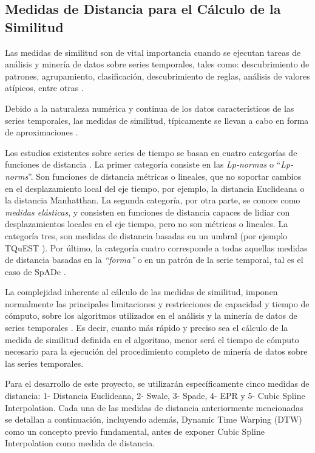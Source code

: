 \subsection{Medidas de Distancia para el C\'alculo de la Similitud}
Las medidas de similitud son de vital importancia cuando se ejecutan tareas de an\'alisis y miner\'ia de datos sobre series temporales, tales como: descubrimiento de patrones, agrupamiento, clasificaci\'on, descubrimiento de reglas, an\'alisis de valores at\'ipicos, entre otras \cite{concepts}.\par
Debido a la naturaleza num\'erica y continua de los datos caracter\'isticos de las series temporales, las medidas de similitud, t\'ipicamente se llevan a cabo en forma de aproximaciones \cite{distancecomparison}.\par
Los estudios existentes sobre series de tiempo se basan en cuatro categor\'ias de funciones de distancia \cite{measurements}. La primer categor\'ia consiste en las \textit{Lp-normas} o \enquote{\textit{Lp-norms}}. Son funciones de distancia m\'etricas o lineales, que no soportar cambios en el desplazamiento local del eje tiempo, por ejemplo, la distancia Euclideana o la distancia Manhatthan. La segunda categor\'ia, por otra parte, se conoce como \textit{medidas el\'asticas}, y consisten en funciones de distancia capaces de lidiar con desplazamientos locales en el eje tiempo, pero no son m\'etricas o lineales. La categor\'ia tres, son medidas de distancia basadas en un umbral (por ejemplo TQuEST \cite{distancecomparison}). Por \'ultimo, la categor\'ia cuatro corresponde a todas aquellas medidas de distancia basadas en la \textit{\enquote{forma}} o en un patr\'on de la serie temporal, tal es el caso de SpADe \cite{spade}. \par
La complejidad inherente al c\'alculo de las medidas de similitud, imponen normalmente las principales limitaciones y restricciones de capacidad y tiempo de c\'omputo, sobre los algoritmos utilizados en el an\'alisis y la miner\'ia de datos de series temporales \cite{algoanalysis}. Es decir, cuanto m\'as r\'apido y preciso sea el c\'alculo de la medida de similitud definida en el algoritmo, menor ser\'a el tiempo de c\'omputo necesario para la ejecuci\'on del procedimiento completo de miner\'ia de datos sobre las series temporales.\par
Para el desarrollo de este proyecto, se utilizar\'an espec\'ificamente cinco medidas de distancia: 1- Distancia Euclideana, 2- Swale, 3- Spade, 4- EPR y 5- Cubic Spline Interpolation. Cada una de las medidas de distancia anteriormente mencionadas se detallan a continuaci\'on, incluyendo adem\'as, Dynamic Time Warping (DTW) como un concepto previo fundamental, antes de exponer Cubic Spline Interpolation como medida de distancia.
